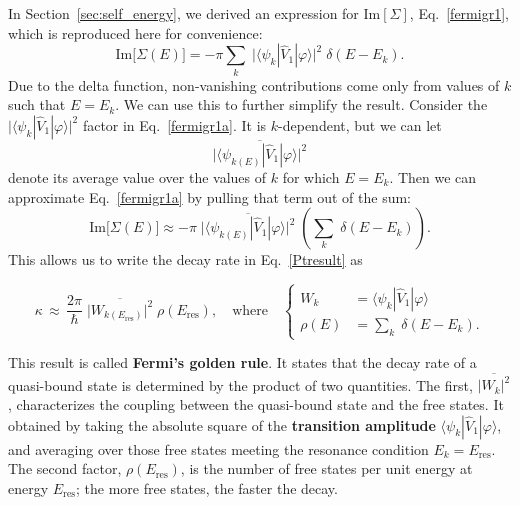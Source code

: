 \documentclass[pra,12pt]{revtex4}
\begin{document}
\clearpage
In Section~\ref{sec:self_energy}, we derived an expression for
$\mathrm{Im}[\Sigma]$, Eq.~\eqref{fermigr1}, which is reproduced here
for convenience:
\begin{equation}
  \mathrm{Im}\big[\Sigma(E)\big]
  = - \pi \sum_k \; \big| \langle\psi_k| \hat{V}_1|\varphi\rangle\big|^2
  \; \delta(E-E_k).
  \label{fermigr1a}
\end{equation}
Due to the delta function, non-vanishing contributions come only from
values of $k$ such that $E = E_k$.  We can use this to further
simplify the result.  Consider the $\big| \langle\psi_k|
\hat{V}_1|\varphi\rangle\big|^2$ factor in Eq.~\eqref{fermigr1a}.  It
is $k$-dependent, but we can let
\begin{equation*}
  \overline{\big| \langle\psi_{k(E)}| \hat{V}_1|\varphi\rangle\big|^2}
\end{equation*}
denote its average value over the values of $k$ for which $E = E_k$.
Then we can approximate Eq.~\eqref{fermigr1a} by pulling that term out
of the sum:
\begin{equation}
  \mathrm{Im}\big[\Sigma(E)\big]
  \approx - \pi \;
  \overline{\big| \langle\psi_{k(E)}| \hat{V}_1|\varphi\rangle\big|^2}
  \; \left( \sum_k \; \delta(E-E_k) \right).
  \label{fermigr2}
\end{equation}
This allows us to write the decay rate in Eq.~\eqref{Ptresult} as
\begin{framed}
  \begin{equation}
    \kappa
    \,\approx\, \frac{2\pi}{\hbar} \;
    \overline{\big|W_{k(E_\mathrm{res})}\big|^2} \; \rho(E_{\mathrm{res}}),
    \quad \mathrm{where} \quad \left\{
    \begin{aligned}
      W_{k} &= \langle\psi_{k}| \hat{V}_1|\varphi\rangle \\
      \rho(E) &= \sum_k \; \delta(E-E_k).
    \end{aligned}\right.
    \label{FGR}
  \end{equation}
\end{framed}

This result is called \textbf{Fermi's golden rule}.  It states that
the decay rate of a quasi-bound state is determined by the product of
two quantities.  The first, $\overline{|W_k|^2}$, characterizes the
coupling between the quasi-bound state and the free states.  It
obtained by taking the absolute square of the \textbf{transition
  amplitude} $\langle\psi_{k}| \hat{V}_1|\varphi\rangle$, and
averaging over those free states meeting the resonance condition $E_k
= E_{\mathrm{res}}$.  The second factor, $\rho(E_{\mathrm{res}})$, is
the number of free states per unit energy at energy
$E_{\mathrm{res}}$; the more free states, the faster the decay.
\end{document}
